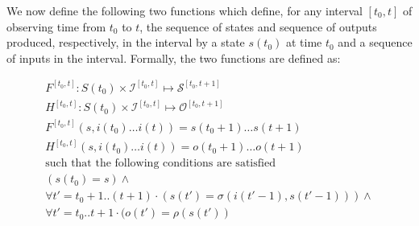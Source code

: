We now define the following two functions which define,  for any interval $[t_0,t]$ of observing time from $t_0$ to $t$,  the sequence of states and sequence of outputs produced, respectively,  in the interval by a state $s(t_0)$ at time $t_0$ and a sequence of inputs in the interval. Formally, the two functions are defined as:


\[
\begin{array}{llllll}
F^{[t_0,t]}: S(t_0)\times \mathcal{I}^{[t_0,t]} \mapsto \mathcal{S}^{[t_0,t+1]}\\
 H^{[t_0,t]}: S(t_0)\times \mathcal{I}^{[t_0,t]} \mapsto \mathcal{O}^{[t_0,t+1]}\\
F^{[t_0,t]}(s, i(t_0)\ldots i(t))= s(t_0+1)\ldots s(t+1)\\
H^{[t_0,t]}(s, i(t_0)\ldots i(t))= o(t_0+1)\ldots o(t+1)\\
\mbox{such that the following conditions are satisfied}\\
 (s(t_0)=s)\wedge \\
 \forall t'=t_0+1..(t+1)\cdot (s(t')=\sigma(i(t'-1),s(t'-1)))\wedge \\
 \forall t'=t_0..t+1\cdot (o(t')=\rho(s(t'))
\end{array}
\]

